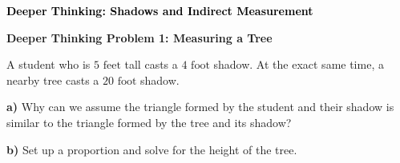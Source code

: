 \documentclass[12pt, letterpaper, fleqn]{article}
\begin{document}
\newpage

\begin{tcolorbox}[colback=customteal!20]
\large\textcolor{black}{\textbf{Deeper Thinking: Shadows and Indirect Measurement}}
\end{tcolorbox}

\vspace{3mm}

\begin{tcolorbox}[colback=white!15, colframe=black, boxrule=1.5pt, arc=4mm, left=6mm, right=6mm, top=5mm, bottom=5mm]

\textbf{Deeper Thinking Problem 1: Measuring a Tree}

\medskip

\noindent
A student who is $5\text{ feet}$ tall casts a $4\text{ foot}$ shadow. At the exact same time, a nearby tree casts a $20\text{ foot}$ shadow. 

\vspace{5mm}

\noindent
\textbf{a)} Why can we assume the triangle formed by the student and their shadow is similar to the triangle formed by the tree and its shadow?

\vspace{2.5cm}

\noindent
\textbf{b)} Set up a proportion and solve for the height of the tree.

\vspace{3cm}

\end{tcolorbox}
\end{document}
